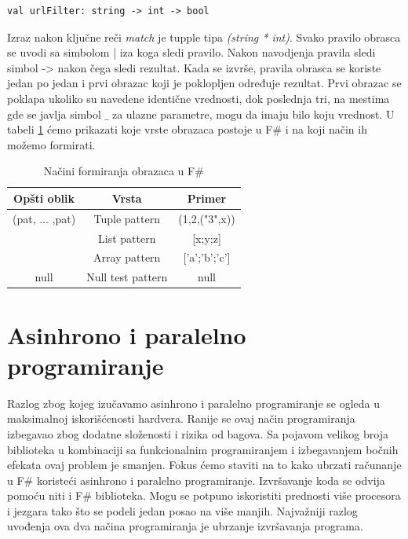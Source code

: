 \documentclass[a4paper]{article}
\begin{document}
\begin{lstlisting}
val urlFilter: string -> int -> bool
\end{lstlisting}

Izraz nakon ključne reči {\em match} je tupple tipa {\em (string * int)}. Svako pravilo obrasca se uvodi sa simbolom | iza koga sledi pravilo. Nakon navodjenja pravila sledi simbol -> nakon čega sledi rezultat. Kada se izvrše, pravila obrasca se koriste jedan po jedan i prvi obrazac koji je poklopljen određuje rezultat. Prvi obrazac se poklapa ukoliko su navedene identične vrednosti, dok poslednja tri, na mestima gde se javlja simbol $\_$ za ulazne parametre, mogu da imaju bilo koju vrednost. U tabeli \ref{tab:tabela1} ćemo prikazati koje vrste obrazaca postoje u F\# i na koji način ih možemo formirati.
 
\begin{table}[h!]
\begin{center}
\caption{Načini formiranja obrazaca u F\#}
\begin{tabular}{|c|c|c|} \hline
\textbf{Opšti oblik}& \textbf{Vrsta}& \textbf{Primer}\\ \hline
(pat, ... ,pat) &Tuple pattern&(1,2,("3",x))
\\ \hline
[pat, ... ,pat] &List pattern&[x;y;z]\\ \hline
[|pat, ... ,pat|] &Array pattern&['a';'b';'c']\\ \hline
null &Null test pattern&null\\ \hline
\end{tabular}
\label{tab:tabela1}
\end{center}
\end{table}


\section{Asinhrono i paralelno programiranje}

Razlog zbog kojeg izučavamo asinhrono i paralelno programiranje se ogleda u maksimalnoj iskorišćenosti hardvera. Ranije se ovaj način programiranja izbegavao zbog dodatne složenosti i rizika od bagova. Sa pojavom velikog broja biblioteka u kombinaciji sa funkcionalnim programiranjem i izbegavanjem bočnih efekata ovaj problem je smanjen. Fokus ćemo staviti na to kako ubrzati računanje u F\# koristeći asinhrono i paralelno programiranje. Izvršavanje koda se odvija pomoću niti i F\# biblioteka. Mogu se potpuno iskoristiti prednosti više procesora i jezgara tako što se podeli jedan posao na više manjih. Najvažniji razlog uvođenja ova dva načina programiranja je ubrzanje izvršavanja programa.
\end{document}
